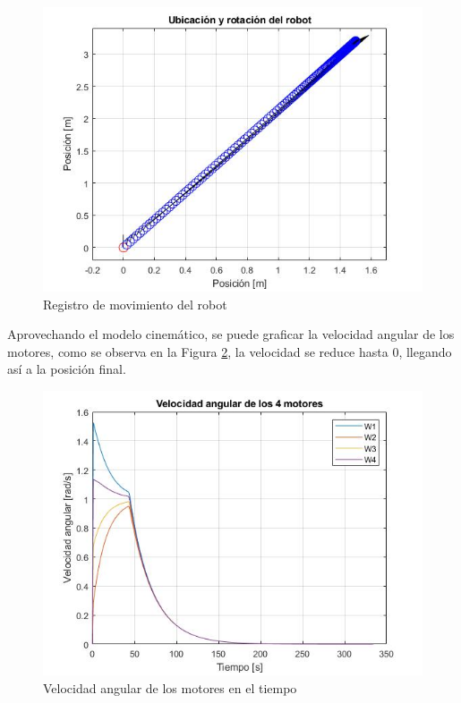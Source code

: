 \documentclass[conference]{IEEEtran}
\begin{document}
\begin{figure}
  \includegraphics[width=\linewidth]{figures/matlab_pos_1.jpg}
  \caption{Registro de movimiento del robot}
  \label{fig:robotpos}
\end{figure}


Aprovechando el modelo cinemático, se puede graficar la velocidad angular de
los motores, como se observa en la Figura \ref{fig:motorang}, la velocidad se reduce hasta 0,
llegando así a la posición final.

\begin{figure}
  \includegraphics[width=\linewidth]{figures/matlab_motor_1.jpg}
  \caption{Velocidad angular de los motores en el tiempo}
  \label{fig:motorang}
\end{figure}
\end{document}
